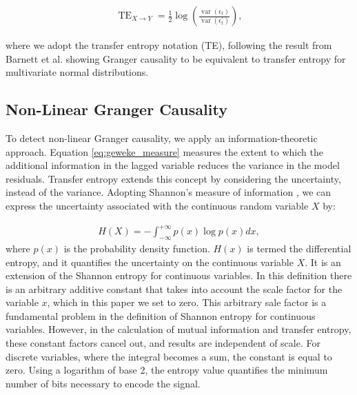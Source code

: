 \documentclass[]{rsos}%
\begin{document}
  \begin{eqnarray}
    \label{eq:geweke_measure}
    \operatorname{TE}_{X\rightarrow Y} = \frac12\log \left(
      \frac{\operatorname{var}(\epsilon_t)}
          {\operatorname{var}(\epsilon^{\prime}_t)}
  \right) ,
  \end{eqnarray}

    where we adopt the transfer entropy notation (TE), following the result from Barnett et al. \cite{barnett2009granger} showing Granger causality to be equivalent to transfer entropy for multivariate normal distributions.

  \subsection{Non-Linear {\color{blue}Granger} Causality}

  To detect non-linear {\color{blue}Granger} causality, we apply an information-theoretic approach. Equation \ref{eq:geweke_measure} measures the extent to which the additional information in the lagged variable reduces the variance in the model residuals. Transfer entropy extends this concept by considering the uncertainty, instead of the variance. Adopting Shannon's measure of information \cite{shannon1948}, we can express the uncertainty associated with the continuous random variable $X$ by:

  \begin{eqnarray}
    \label{eq:entropy}
    H(X) = - \int_{-\infty}^{+\infty}  { p(x) \log{p(x)}  } dx,
  \end{eqnarray}
where $p(x)$ is the probability density function.   
$H(x)$ is termed the differential entropy, and it quantifies the uncertainty on the continuous variable $X$. It is an extension of the Shannon entropy for continuous variables. 
In this definition there is an arbitrary additive constant that takes into account the scale factor for the variable $x$, which in this paper we set to zero.
This arbitrary sale factor is a fundamental problem in the definition of Shannon entropy for continuous variables. 
However, in the calculation of mutual information and  transfer entropy, these constant factors cancel out, and results are independent of scale.
For discrete variables, where the integral becomes a sum, the constant is equal to zero. Using a logarithm of base 2, the entropy value quantifies the minimum number of bits necessary to encode the signal. 
\end{document}
